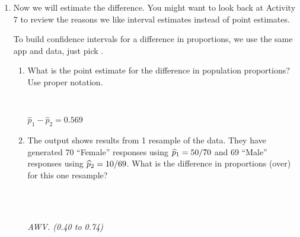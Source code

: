 \begin{enumerate}
\begin{enumerate}
\begin{key}
      \\ {\it Reject $H_0$.}\\
\end{key}
       State your conclusion about $H_0$ in the context of this
       situation. Be as specific   as possible about the true
       proportions overestimating their weight.
\begin{students}
 \ \   \vspace*{2cm}\\
\end{students}
\begin{key}
   {\it We conclude that when people are wrong about their weight, a
     much larger proportion of women than men say they are over,
     rather than under weight.}
\end{key}
\end{enumerate}

\item Now we will estimate the difference.  You might want to look
   back at Activity 7 to review the reasons we like interval estimates
   instead of point estimates.

   To build confidence intervals for a difference in proportions, we
   use the same app and data, just pick .

    \begin{enumerate}
      \item    \label{phatDiff} What is the point estimate for the
       difference in population    proportions? Use proper notation.
\begin{students}
 \ \   \vspace*{1cm}\\
\end{students}
\begin{key}
   $\widehat{p}_1  - \widehat{p}_2 =    0.569$
\end{key}

\item The output shows results from 1 resample of the data.
       They have generated  70 ``Female'' responses using $\widehat{p}_1 =
       50/70$ and 69 ``Male'' responses using $\widehat{p}_2 = 10/69$. What
       is the difference in proportions (over) for this one resample?
\begin{students}
 \ \   \vspace*{1cm}\\
\end{students}
\begin{key}
   \\ {\it AWV. (0.40 to 0.74) }  
\end{key}


\end{enumerate}
\end{enumerate}
